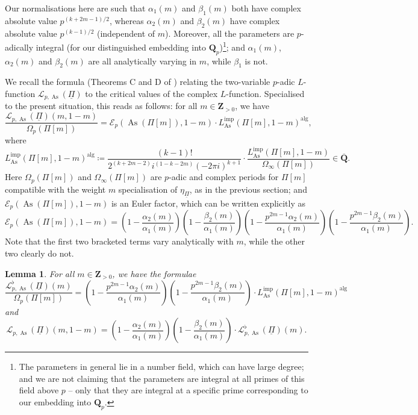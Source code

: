 \documentclass[a4paper,10pt]{amsart}
\theoremstyle{plain}
\newtheorem{lemma}[theorem]{Lemma}
\theoremstyle{remark}
\DeclareMathOperator{\imp}{imp}
\DeclareMathOperator{\alg}{alg}
\DeclareMathOperator{\As}{As}
\newcommand{\QQ}{\mathbf{Q}}
\newcommand{\Qp}{\QQ_p}
\newcommand{\ZZ}{\mathbf{Z}}
\newcommand{\cE}{\mathcal{E}}
\newcommand{\cL}{\mathcal{L}}
\newcommand{\uPi}{\underline{\Pi}}
\numberwithin{equation}{section}
\begin{document}
  Our normalisations here are such that $\alpha_1(m)$ and $\beta_1(m)$ both have complex absolute value $p^{(k + 2m - 1)/2}$, whereas $\alpha_2(m)$ and $\beta_2(m)$ have complex absolute value $p^{(k - 1)/2}$ (independent of $m$). Moreover, all the parameters are $p$-adically integral (for our distinguished embedding into $\Qp$)\footnote{The parameters in general lie in a number field, which can have large degree; and we are not claiming that the parameters are integral at all primes of this field above $p$ -- only that they are integral at a specific prime corresponding to our embedding into $\Qp$.}; and $\alpha_1(m)$, $\alpha_2(m)$ and $\beta_2(m)$ are all analytically varying in $m$, while $\beta_1$ is not.

  We recall the formula (Theorems C and D of \cite{grossiloefflerzerbesLfunct}) relating the two-variable $p$-adic $L$-function $\cL_{p, \As}(\uPi)$ to the critical values of the complex $L$-function. Specialised to the present situation, this reads as follows: for all $m \in \ZZ_{> 0}$, we have
  \begin{equation}
   \label{eq:interp}
   \frac{\cL_{p, \As}(\uPi)(m, 1 - m)}{\Omega_p(\Pi[m])} =
   \cE_p(\As(\Pi[m]), 1 - m) \cdot L_{\As}^{\imp}(\Pi[m], 1 - m)^{\alg},
  \end{equation}
  where
  \[ L_{\As}^{\imp}(\Pi[m], 1 - m)^{\alg} \coloneqq \frac{(k-1)!}{2^{(k + 2m - 2)} i^{(1-k-2m)} (-2\pi i)^{k+1}} \cdot \frac{L_{\As}^{\imp}(\Pi[m], 1 - m)}{\Omega_\infty(\Pi[m])} \in \overline{\QQ}.\]
  Here $\Omega_p(\Pi[m])$ and $\Omega_\infty(\Pi[m])$ are $p$-adic and complex periods for $\Pi[m]$ compatible with the weight $m$ specialisation of $\eta_{\uPi}$, as in the previous section; and $\cE_p(\As(\Pi[m]), 1 - m)$ is an Euler factor, which can be written explicitly as
  \[ \cE_p(\As(\Pi[m]), 1 - m) =
  \left(1 - \frac{\alpha_2(m)}{\alpha_1(m)}\right)
  \left(1 - \frac{\beta_2(m)}{\alpha_1(m)}\right)
  \left(1 - \frac{p^{2m-1} \alpha_2(m)}{\alpha_1(m)}\right)
  \left(1 - \frac{p^{2m-1} \beta_2(m)}{\alpha_1(m)}\right).\]
  Note that the first two bracketed terms vary analytically with $m$, while the other two clearly do not.

  \begin{lemma}
   For all $m\in\ZZ_{>0}$, we have the formulae
   \[ \frac{\cL^\flat_{p,\As}(\uPi)(m)}{\Omega_p(\Pi[m])}
     = \left(1 - \frac{p^{2m-1} \alpha_2(m)}{\alpha_1(m)}\right)
       \left(1 - \frac{p^{2m-1} \beta_2(m)}{\alpha_1(m)}\right)\cdot L_{\As}^{\imp}(\Pi[m], 1 - m)^{\alg} \]
   and
   \[ \cL_{p,\As}(\uPi)(m, 1 - m) = \left(1-\frac{\alpha_2(m)}{\alpha_1(m)}\right)\left(1-\frac{
   \beta_2(m)}{\alpha_1(m)}\right)\cdot \cL^\flat_{p,\As}(\uPi)(m). \]
  \end{lemma}
\end{document}
